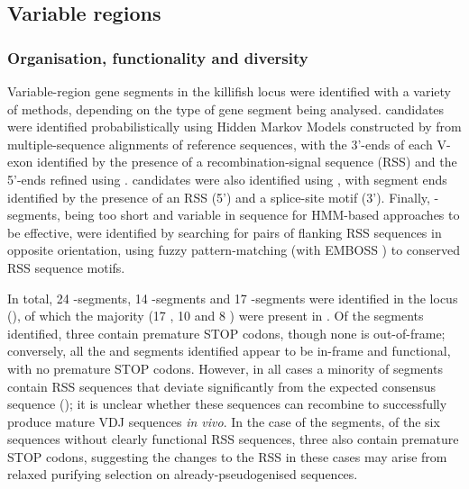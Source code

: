 \subsection{Variable regions}
\label{sec:nfu-locus-variable}
	
\subsubsection{Organisation, functionality and diversity}
\label{sec:nfu-locus-variable-orga}

Variable-region gene segments in the killifish \igh{} locus were identified with a variety of methods, depending on the type of gene segment being analysed. \vh candidates were identified probabilistically using Hidden Markov Models constructed by  from  multiple-sequence alignments of reference sequences, with the 3'-ends of each V-exon identified by the presence of a recombination-signal sequence (RSS) and the 5'-ends refined using . \jh candidates were also identified using , with segment ends identified by the presence of an RSS (5') and a  splice-site motif (3'). Finally, \dh-segments, being too short and variable in sequence for HMM-based approaches to be effective, were identified by searching for pairs of flanking RSS sequences in opposite orientation, using fuzzy pattern-matching (with EMBOSS ) to conserved RSS sequence motifs.
	 
In total, 24 \vh-segments, 14 \dh-segments and 17 \jh-segments were identified in the \Nfu locus (), of which the majority (17 \vh, 10 \dh and 8 \jh) were present in . Of the \vh segments identified, three contain premature STOP codons, though none is out-of-frame; conversely, all the \dh and \jh segments identified appear to be in-frame and functional, with no premature STOP codons. However, in all cases a minority of segments contain RSS sequences that deviate significantly from the expected consensus sequence (); it is unclear whether these sequences can recombine to successfully produce mature VDJ sequences \textit{in vivo}. In the case of the \vh segments, of the six sequences without clearly functional RSS sequences, three also contain premature STOP codons, suggesting the changes to the RSS in these cases may arise from relaxed purifying selection on already-pseudogenised sequences.
	
